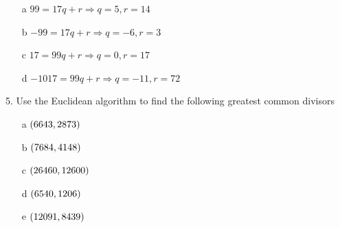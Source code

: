 \begin{mdframed}[style=darkAnswer,frametitle={Joe Starr}]
\begin{itemize}
    \item [a] {$99=17q+r\Rightarrow q=5, r=14$}
    \item [b] {$-99=17q+r\Rightarrow q=-6, r=3$}
    \item [c] {$17=99q+r\Rightarrow q=0, r=17$}
    \item [d] {$-1017=99q+r\Rightarrow q=-11, r=72$}
\end{itemize}
\end{mdframed}

\newpage
\begin{mdframed}[style=darkQuesion]
5.    Use the Euclidean algorithm to find the following greatest common divisors
\begin{itemize}
    \item [a] {$\left(6643,2873\right)$}
    \item [b] {$\left(7684,4148\right)$}
    \item [c] {$\left(26460,12600\right)$}
    \item [d] {$\left(6540,1206\right)$}
    \item [e] {$\left(12091,8439\right)$}
\end{itemize}

\end{mdframed}


